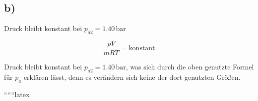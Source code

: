 

\subsection*{b)}

Druck bleibt konstant bei $p_{a2} = 1.40 \, \text{bar}$

\[
\frac{pV}{mRT} = \text{konstant}
\]

Druck bleibt konstant bei $p_{a2} = 1.40 \, \text{bar}$, was sich durch die oben genutzte Formel für $p_a$ erklären lässt, denn es verändern sich keine der dort genutzten Größen.

``````latex